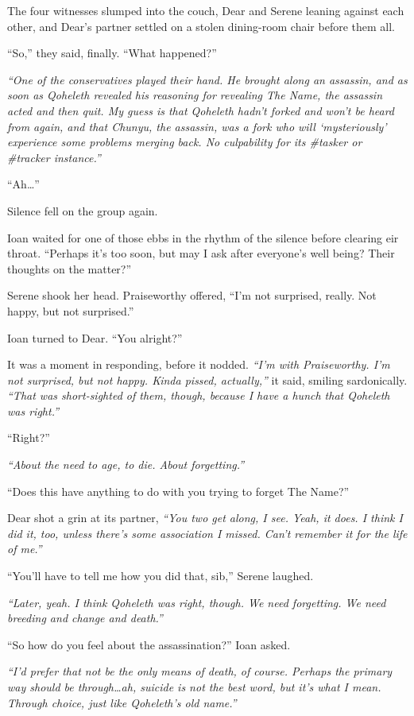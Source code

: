 The four witnesses slumped into the couch, Dear and Serene leaning against each other, and Dear's partner settled on a stolen dining-room chair before them all.

``So,'' they said, finally. ``What happened?''

\emph{``One of the conservatives played their hand. He brought along an assassin, and as soon as Qoheleth revealed his reasoning for revealing The Name, the assassin acted and then quit. My guess is that Qoheleth hadn't forked and won't be heard from again, and that Chunyu, the assassin, was a fork who will `mysteriously' experience some problems merging back. No culpability for its \#tasker or \#tracker instance.''}

``Ah\ldots{}''

Silence fell on the group again.

Ioan waited for one of those ebbs in the rhythm of the silence before clearing eir throat. ``Perhaps it's too soon, but may I ask after everyone's well being? Their thoughts on the matter?''

Serene shook her head. Praiseworthy offered, ``I'm not surprised, really. Not happy, but not surprised.''

Ioan turned to Dear. ``You alright?''

It was a moment in responding, before it nodded. \emph{``I'm with Praiseworthy. I'm not surprised, but not happy. Kinda pissed, actually,''} it said, smiling sardonically. \emph{``That was short-sighted of them, though, because I have a hunch that Qoheleth was right.''}

``Right?''

\emph{``About the need to age, to die. About forgetting.''}

``Does this have anything to do with you trying to forget The Name?''

Dear shot a grin at its partner, \emph{``You two get along, I see. Yeah, it does. I think I did it, too, unless there's some association I missed. Can't remember it for the life of me.''}

``You'll have to tell me how you did that, sib,'' Serene laughed.

\emph{``Later, yeah. I think Qoheleth was right, though. We need forgetting. We need breeding and change and death.''}

``So how do you feel about the assassination?'' Ioan asked.

\emph{``I'd prefer that not be the only means of death, of course. Perhaps the primary way should be through\ldots{}ah, suicide is not the best word, but it's what I mean. Through choice, just like Qoheleth's old name.''}

